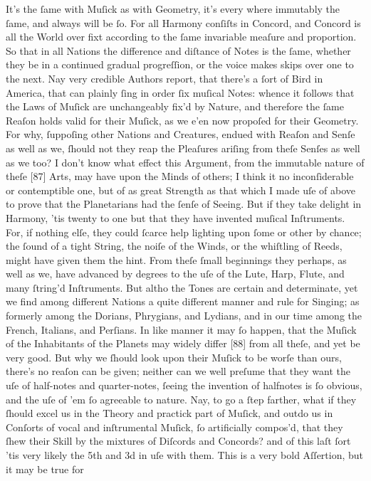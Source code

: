 \documentclass[letterpaper]{book}
\begin{document}
It's the ſame with Muſick as with Geometry, it's every where immutably the
ſame, and always will be ſo. For all Harmony conſiſts in Concord, and
Concord is all the World over fixt according to the ſame invariable meaſure
and proportion. So that in all Nations the difference and diſtance of Notes
is the ſame, whether they be in a continued gradual progreſſion, or the
voice makes skips over one to the next. Nay very credible Authors report,
that there's a ſort of Bird in America, that can plainly ſing in order ſix
muſical Notes: whence it follows that the Laws of Muſick are unchangeably
fix'd by Nature, and therefore the ſame Reaſon holds valid for their Muſick,
as we e'en now propoſed for their Geometry. For why, ſuppoſing other Nations
and Creatures, endued with Reaſon and Senſe as well as we, ſhould not they
reap the Pleaſures ariſing from theſe Senſes as well as we too? I don't know
what effect this Argument, from the immutable nature of theſe [87] Arts, may
have upon the Minds of others; I think it no inconſiderable or contemptible
one, but of as great Strength as that which I made uſe of above to prove
that the Planetarians had the ſenſe of Seeing.  But if they take delight in
Harmony, 'tis twenty to one but that they have invented muſical Inſtruments.
For, if nothing elſe, they could ſcarce help lighting upon ſome or other by
chance; the ſound of a tight String, the noiſe of the Winds, or the
whiſtling of Reeds, might have given them the hint.  From theſe ſmall
beginnings they perhaps, as well as we, have advanced by degrees to the uſe
of the Lute, Harp, Flute, and many ſtring'd Inſtruments.  But altho the
Tones are certain and determinate, yet we find among different Nations a
quite different manner and rule for Singing; as formerly among the Dorians,
Phrygians, and Lydians, and in our time among the French, Italians, and
Perſians. In like manner it may ſo happen, that the Muſick of the
Inhabitants of the Planets may widely differ [88] from all theſe, and yet be
very good. But why we ſhould look upon their Muſick to be worſe than ours,
there's no reaſon can be given; neither can we well preſume that they want
the uſe of half-notes and quarter-notes, ſeeing the invention of halfnotes
is ſo obvious, and the uſe of 'em ſo agreeable to nature. Nay, to go a ſtep
farther, what if they ſhould excel us in the Theory and practick part of
Muſick, and outdo us in Conſorts of vocal and inſtrumental Muſick, ſo
artificially compos'd, that they ſhew their Skill by the mixtures of
Diſcords and Concords? and of this laſt ſort 'tis very likely the 5th and 3d
in uſe with them.  This is a very bold Aſſertion, but it may be true for
\end{document}
